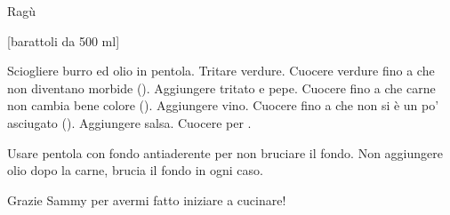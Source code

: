 \begin{recipe}{Ragù}
    \begin{header}
        [barattoli da 500 ml]
    
    \end{header}
    
    \begin{ingredients}[10]
    \end{ingredients}
    
    \begin{preparation}
        \step Sciogliere burro ed olio in pentola.
        \step Tritare verdure.
        \step Cuocere verdure fino a che non diventano morbide ().
        \step Aggiungere tritato e pepe.
        \step Cuocere fino a che carne non cambia bene colore ().
        \step Aggiungere vino.
        \step Cuocere fino a che non si è un po' asciugato ().
        \step Aggiungere salsa.
        \step Cuocere per .
    \end{preparation}
    
    \begin{suggestion}
        \suggestionMark Usare pentola con fondo antiaderente per non bruciare il fondo.
        \suggestionMark Non aggiungere olio dopo la carne, brucia il fondo in ogni caso.
    \end{suggestion}
    
    \begin{hint}
        Grazie Sammy per avermi fatto iniziare a cucinare!
    \end{hint}
\end{recipe}
